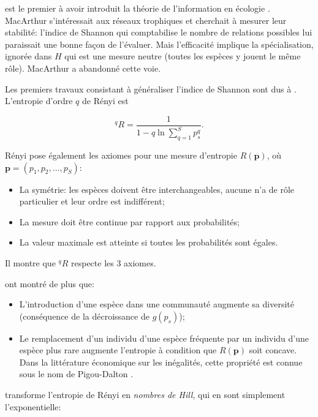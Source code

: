 \documentclass[
  11pt,
  french,
  a4paper,
  extrafontsizes,onecolumn,openright
  ]{memoir}
\providecommand{\tightlist}{%
  \setlength{\itemsep}{0pt}\setlength{\parskip}{0pt}}
\begin{document}
\textcite{MacArthur1955} est le premier à avoir introduit la théorie de l'information en écologie \autocite{Ulanowicz2001}.
MacArthur s'intéressait aux réseaux trophiques et cherchait à mesurer leur stabilité: l'indice de Shannon qui comptabilise le nombre de relations possibles lui paraissait une bonne façon de l'évaluer.
Mais l'efficacité implique la spécialisation, ignorée dans \(H\) qui est une mesure neutre (toutes les espèces y jouent le même rôle).
MacArthur a abandonné cette voie.

Les premiers travaux consistant à généraliser l'indice de Shannon sont dus à \textcite{Renyi1961}.
L'entropie d'ordre \(q\) de Rényi est

\begin{equation}
^{q}\!R =\frac{1}{1-q\ln\sum^S_{q=1}{p^q_s}}.
\end{equation}

Rényi pose également les axiomes pour une mesure d'entropie \(R\left(\mathbf{p}\right)\), où \(\mathbf{p}=(p_1,p_2,\dots,p_S)\):

\begin{itemize}
\tightlist
\item
  La symétrie: les espèces doivent être interchangeables, aucune n'a de rôle particulier et leur ordre est indifférent;
\item
  La mesure doit être continue par rapport aux probabilités;
\item
  La valeur maximale est atteinte si toutes les probabilités sont égales.
\end{itemize}

Il montre que \(^{q}\!R\) respecte les 3 axiomes.

\textcite{Patil1982} ont montré de plus que:

\begin{itemize}
\tightlist
\item
  L'introduction d'une espèce dans une communauté augmente sa diversité (conséquence de la décroissance de \(g(p_s)\));
\item
  Le remplacement d'un individu d'une espèce fréquente par un individu d'une espèce plus rare augmente l'entropie à condition que \(R(\mathbf{p})\) soit concave.
  Dans la littérature économique sur les inégalités, cette propriété est connue sous le nom de Pigou-Dalton \autocite{Dalton1920}.
\end{itemize}

\textcite{Hill1973} transforme l'entropie de Rényi en \emph{nombres de Hill}, qui en sont simplement l'exponentielle:
\end{document}
